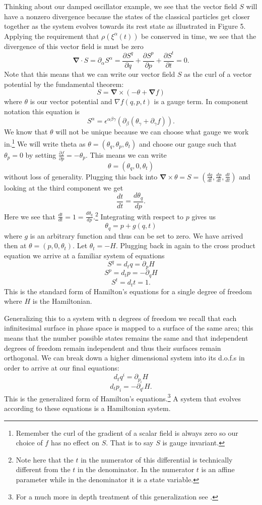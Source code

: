 \documentclass{article}[a4paper]
\begin{document}
	Thinking about our damped oscillator example, we see that the vector field $S$ will have a nonzero divergence because the states of the classical particles get closer together as the system evolves towards its rest state as illustrated in Figure 5. Applying the requirement that $\rho(\xi^\alpha(t))$ be conserved in time, we see that the divergence of this vector field is must be zero $$\mathbf{\nabla} \cdot S = \partial_\alpha S^\alpha = \frac{\partial S^q}{\partial q} + \frac{\partial S^p}{\partial p} + \frac{\partial S^t}{\partial t} = 0.$$ Note that this means that we can write our vector field $S$ as the curl of a vector potential by the fundamental theorem: $$S = \mathbf{\nabla} \times (-\theta + \mathbf{\nabla} f)$$ where $\theta$ is our vector potential and $\nabla f(q,p,t)$ is a gauge term. In component notation this equation is $$S^\alpha = \epsilon^{\alpha \beta \gamma}(\partial_\beta(\theta_\gamma + \partial_\gamma f)).$$ We know that $\theta$  will not be unique because we can choose what gauge we work in.\footnote{Remember the curl of the gradient of a scalar field is always zero so our choice of $f$ has no effect on $S$. That is to say $S$ is gauge invariant.} We will write theta as $\theta = (\theta_q, \theta_p, \theta_t)$ and choose our gauge such that $\theta_p = 0$ by setting $\frac{\partial f}{\partial p} = -\theta_p$. This means we can write $$\theta = (\theta_q, 0, \theta_t)$$ without loss of generality. Plugging this back into $\mathbf{\nabla} \times \theta = S = (\frac{dq}{dt},\frac{dp}{dt}, \frac{dt}{dt} )$ and looking at the third component we get $$\frac{dt}{dt} = \frac{d \theta_q}{dp}.$$ Here we see that $\frac{dt}{dt} = 1 = \frac{d \theta_q}{dp}$.\footnote{Note here that the $t$ in the numerator of this differential is technically different from the $t$ in the denominator. In the numerator $t$ is an affine parameter while in the denominator it is a state variable.} Integrating with respect to $p$ gives us $$\theta_q = p + g(q,t)$$ where $g$ is an arbitrary function and thus can be set to zero. We have arrived then at $\theta = (p,0,\theta_t)$. Let $\theta_t = -H$. Plugging back in again to the cross product equation we arrive at a familiar system of equations $$S^q = d_t q = \partial _{p} H$$ $$S^p = d_t p = -\partial _q H$$ $$S^t = d_t t = 1.$$ This is the standard form of Hamilton's equations for a single degree of freedom where $H$ is the Hamiltonian.
	
	Generalizing this to a system with n degrees of freedom we recall that each infinitesimal surface in phase space is mapped to a surface of the same area; this means that the number possible states remains the same and that independent degrees of freedom remain independent and thus their surfaces remain orthogonal. We can break down a higher dimensional system into its d.o.f.s in order to arrive at our final equations: $$d_tq^i = \partial_{p_i}H$$ $$d_tp_i = -\partial_{q^i}H.$$ This is the generalized form of Hamilton's equations.\footnote{For a much more in depth treatment of this generalization see \cite{Carcassi_2018}.} A system that evolves according to these equations is a Hamiltonian system.
\end{document}
